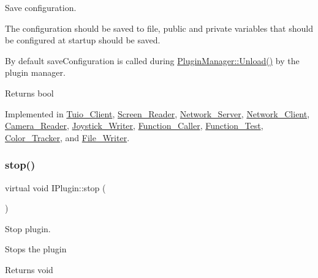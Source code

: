 Save configuration. 

The configuration should be saved to file, public and private variables that should be configured at startup should be saved.

By default save\+Configuration is called during \hyperlink{class_plugin_manager_ab651a05d6fcb92562807e9f5ecc30855}{Plugin\+Manager\+::\+Unload()} by the plugin manager.

\begin{DoxyReturn}{Returns}
bool 
\end{DoxyReturn}


Implemented in \hyperlink{class_tuio___client_a56700c6b7cf9447fde0e3828e90cd55f}{Tuio\+\_\+\+Client}, \hyperlink{class_screen___reader_a6d211f9c63493fbc1b18fd780f61dcdc}{Screen\+\_\+\+Reader}, \hyperlink{class_network___server_a859ab976d5a6f1761f49e3e7abc6bb73}{Network\+\_\+\+Server}, \hyperlink{class_network___client_aeaa8dcaafdecc5a9f417dc07060d6261}{Network\+\_\+\+Client}, \hyperlink{class_camera___reader_a3e7d14b675846c5094311985a0c1e735}{Camera\+\_\+\+Reader}, \hyperlink{class_joystick___writer_a67a56e0ae63ad59657f4745dcac2f7a3}{Joystick\+\_\+\+Writer}, \hyperlink{class_function___caller_a639edde2994f2317a922c2a80083ce54}{Function\+\_\+\+Caller}, \hyperlink{class_function___test_a6d8832ce28b9b659c85db0e32183abc9}{Function\+\_\+\+Test}, \hyperlink{class_color___tracker_a6382a354d9fa79f76c9586a195ea8674}{Color\+\_\+\+Tracker}, and \hyperlink{class_file___writer_a6561b234c4ce33315aa5931463a1cb20}{File\+\_\+\+Writer}.

\mbox{\label{class_i_plugin_a86e523c283aec5c9fb21249a76e916ac}} 
\subsubsection{\texorpdfstring{stop()}{stop()}}
{\footnotesize\ttfamily virtual void I\+Plugin\+::stop (\begin{DoxyParamCaption}{ }\end{DoxyParamCaption})\hspace{0.3cm}{\ttfamily [pure virtual]}}



Stop plugin. 

Stops the plugin \begin{DoxyReturn}{Returns}
void 
\end{DoxyReturn}


